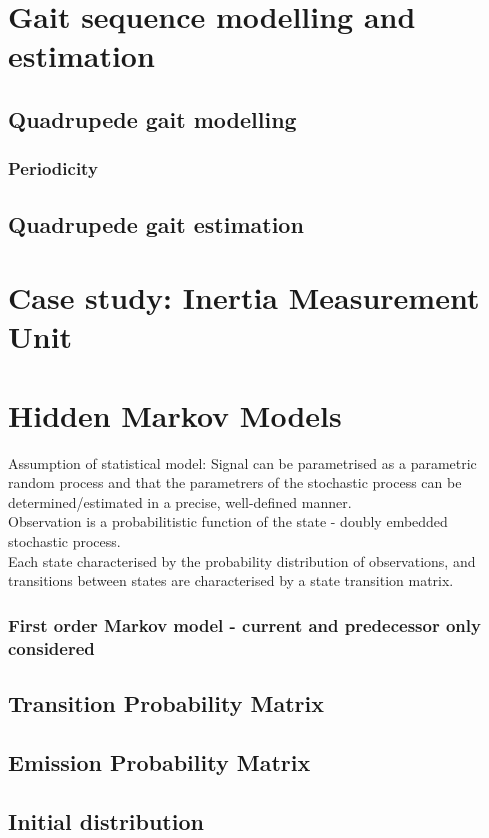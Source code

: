 \section{Gait sequence modelling and estimation}
\subsection{Quadrupede gait modelling}
\subsubsection{Periodicity}
\subsection{Quadrupede gait estimation}
\section{Case study: Inertia Measurement Unit}
\section{Hidden Markov Models}
Assumption of statistical model: Signal can be parametrised as a parametric random process and that the parametrers of the stochastic process can be determined/estimated in a precise, well-defined manner.\\
Observation is a probabilitistic function of the state - doubly embedded stochastic process.\\
Each state characterised by the probability distribution of observations, and transitions between states are characterised by a state transition matrix.
\subsubsection{First order Markov model - current and predecessor only considered}
\subsection{Transition Probability Matrix}
\subsection{Emission Probability Matrix}
\subsection{Initial distribution}
